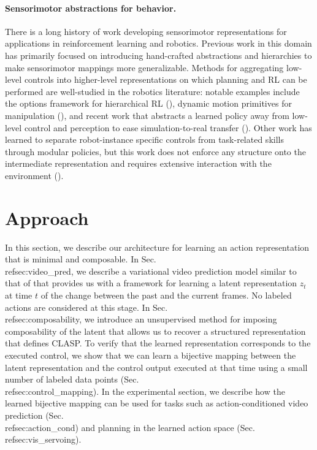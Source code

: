 \documentclass{article} %
\begin{document}
\vspace{-8pt}
\paragraph{Sensorimotor abstractions for behavior.}
There is a long history of work developing sensorimotor representations for applications in reinforcement learning and robotics. Previous work in this domain has primarily focused on introducing hand-crafted abstractions and hierarchies to make sensorimotor mappings more generalizable. Methods for aggregating low-level controls into higher-level representations on which planning and RL can be performed are well-studied in the robotics literature: notable examples include the options framework for hierarchical RL (\cite{sutton1999options,bacon2017option}), dynamic motion primitives for manipulation (\cite{schaal2005motion,schaal2006adaptive,niekum2015learning}), and recent work that abstracts a learned policy away from low-level control and perception to ease simulation-to-real transfer (\cite{clavera2017policy,muller2018driving}). Other work has learned to separate robot-instance specific controls from task-related skills through modular policies, but this work does not enforce any structure onto the intermediate representation and requires extensive interaction with the environment (\cite{devin2017learning}). %

 
\section{Approach}
In this section, %
we describe our architecture 
for learning an action representation that is {minimal} and {composable}. 
In Sec.\\ref{sec:video_pred}, we describe a variational video prediction model similar to that of \cite{denton18stochastic} that provides us with a framework for learning a latent representation $z_t$ at time $t$ of the change between the past and the current frames. No labeled actions are considered at this stage. In Sec.\\ref{sec:composability}, we introduce an unsupervised method for imposing composability of the latent that allows us to recover a structured representation that defines CLASP. To verify that the learned representation corresponds to the executed control, we show that we can learn a bijective mapping between the latent representation and the control output executed at that time using a small number of labeled data points (Sec.\\ref{sec:control_mapping}). In the experimental section, we describe how the learned bijective mapping can be used for tasks such as action-conditioned video prediction (Sec.\\ref{sec:action_cond}) and planning in the learned action space (Sec.\\ref{sec:vis_servoing}).
\end{document}
